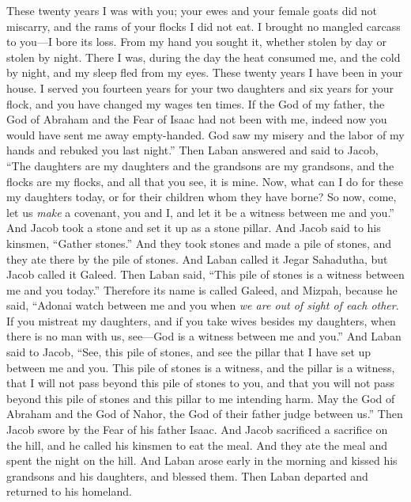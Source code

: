 \begin{biblechapter}
\verse These twenty years I was with you; your ewes and your female goats did not miscarry, and the rams of your flocks I did not eat.
\verse I brought no mangled carcass to you—I bore its loss. From my hand you sought it, whether stolen by day or stolen by night.
\verse There I was, during the day the heat consumed me, and the cold by night, and my sleep fled from my eyes.
\verse These twenty years I have been in your house. I served you fourteen years for your two daughters and six years for your flock, and you have changed my wages ten times.
\verse If the God of my father, the God of Abraham and the Fear of Isaac had not been with me, indeed now you would have sent me away empty-handed. God saw my misery and the labor of my hands and rebuked you last night.”
\verse Then Laban answered and said to Jacob, “The daughters are my daughters and the grandsons are my grandsons, and the flocks are my flocks, and all that you see, it is mine. Now, what can I do for these my daughters today, or for their children whom they have borne?
\verse So now, come, let us \textit{make} a covenant, you and I, and let it be a witness between me and you.”
\verse And Jacob took a stone and set it up as a stone pillar.
\verse And Jacob said to his kinsmen, “Gather stones.” And they took stones and made a pile of stones, and they ate there by the pile of stones.
\verse And Laban called it Jegar Sahadutha, but Jacob called it Galeed.
\verse Then Laban said, “This pile of stones is a witness between me and you today.” Therefore its name is called Galeed,
\verse and Mizpah, because he said, “Adonai watch between me and you when \textit{we are out of sight of each other}.
\verse If you mistreat my daughters, and if you take wives besides my daughters, when there is no man with us, see—God is a witness between me and you.”
\verse And Laban said to Jacob, “See, this pile of stones, and see the pillar that I have set up between me and you.
\verse This pile of stones is a witness, and the pillar is a witness, that I will not pass beyond this pile of stones to you, and that you will not pass beyond this pile of stones and this pillar to me intending harm.
\verse May the God of Abraham and the God of Nahor, the God of their father judge between us.” Then Jacob swore by the Fear of his father Isaac.
\verse And Jacob sacrificed a sacrifice on the hill, and he called his kinsmen to eat the meal. And they ate the meal and spent the night on the hill.
\verse  And Laban arose early in the morning and kissed his grandsons and his daughters, and blessed them. Then Laban departed and returned to his homeland.
\end{biblechapter}

